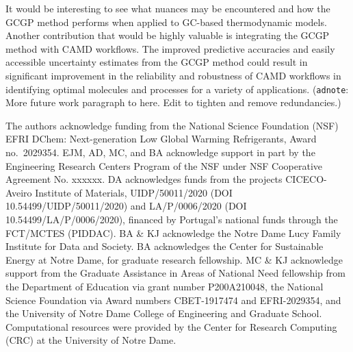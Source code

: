\documentclass[journal=jacsat,manuscript=article, ]{achemso}
\newcommand{\adnote}[1]{{\color{OliveGreen} (\texttt{adnote}: #1)}}
\begin{document}
It would be interesting to see what nuances may be encountered and how the GCGP method performs when applied to GC-based thermodynamic models.
Another contribution that would be highly valuable is integrating the GCGP method with CAMD workflows. The improved predictive accuracies and easily accessible uncertainty estimates from the GCGP method could result in significant improvement in the reliability and robustness of CAMD workflows in identifying optimal molecules and processes for a variety of applications.
\adnote{More future work paragraph to here. Edit to tighten and remove redundancies.}



\begin{acknowledgement}
The authors acknowledge funding from the National Science Foundation (NSF) EFRI DChem: Next-generation Low Global Warming Refrigerants, Award no.~2029354. 
EJM, AD, MC, and BA acknowledge support in part by the Engineering Research Centers Program of the NSF under NSF Cooperative Agreement No. xxxxxx. 
DA acknowledges funds from the projects CICECO-Aveiro Institute of Materials, UIDP/50011/2020 (DOI 10.54499/UIDP/50011/2020) and LA/P/0006/2020 (DOI 10.54499/LA/P/0006/2020), financed by Portugal's national funds through the FCT/MCTES (PIDDAC).
BA \& KJ acknowledge the Notre Dame Lucy Family Institute for Data and Society. BA acknowledges the Center for Sustainable Energy at Notre Dame, for graduate research fellowship. MC \& KJ acknowledge support from the Graduate Assistance in Areas of National Need fellowship from the Department of Education via grant number P200A210048, the National Science Foundation via Award numbers CBET-1917474 and EFRI-2029354, and the University of Notre Dame College of Engineering and Graduate School.  Computational resources were provided by the Center for Research Computing (CRC) at the University of Notre Dame.

\end{acknowledgement}
\end{document}
